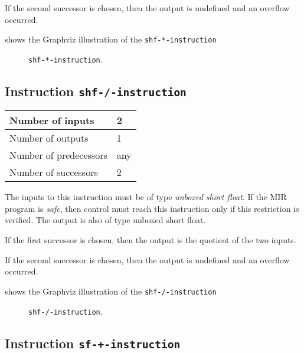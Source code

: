 If the second successor is chosen, then the output is undefined and an
overflow occurred. 

 shows the Graphviz illustration of the
\texttt{shf-*-instruction}

\begin{figure}
\begin{center}
\end{center}
\caption{\label{fig-shf-*-instruction}
\texttt{shf-*-instruction}.}
\end{figure}

\subsection{Instruction \texttt{shf-/-instruction}}
\label{mir-instruction-shf-/}

\begin{tabular}{|l|l|}
\hline
Number of inputs & 2\\
\hline
Number of outputs & 1\\
\hline
Number of predecessors & any\\
\hline
Number of successors & 2\\
\hline
\end{tabular}

The inputs to this instruction must be of type \emph{unboxed short
  float}.  If the MIR program is \emph{safe}, then control must reach
this instruction only if this restriction is verified.  The output is
also of type unboxed short float.

If the first successor is chosen, then the output is
the quotient of the two inputs.  

If the second successor is chosen, then the output is undefined and an
overflow occurred. 

 shows the Graphviz illustration of the
\texttt{shf-/-instruction}

\begin{figure}
\begin{center}
\end{center}
\caption{\label{fig-shf-/-instruction}
\texttt{shf-/-instruction}.}
\end{figure}

\subsection{Instruction \texttt{sf-+-instruction}}
\label{mir-instruction-sf-+}

